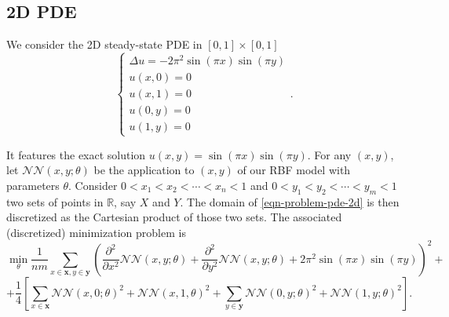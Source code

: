 \documentclass[12pt]{report} %
\newcommand{\tmmathbf}[1]{\ensuremath{\boldsymbol{#1}}}
\newcommand{\mathLaplace}{\Delta}
\begin{document}
\clearpage
\subsection{2D PDE}

We consider the 2D steady-state PDE in $[0, 1] \times [0, 1]$
\begin{equation}
  \left\{\begin{array}{l}
    \mathLaplace u = - 2 \pi^2 \sin (\pi x) \sin (\pi y) \\
    u (x, 0) = 0                                         \\
    u (x, 1) = 0                                         \\
    u (0, y) = 0                                         \\
    u (1, y) = 0
  \end{array}\right. . \label{eqn-problem-pde-2d}
\end{equation}

It features the exact solution $u (x, y) = \sin (\pi x) \sin (\pi y)$. For any
$(x, y)$, let $\mathcal{N}\mathcal{N} (x, y ; \theta)$ be the application to
$(x, y)$ of our RBF model with parameters $\theta$. Consider $0 < x_1 < x_2 <
  \cdots < x_n < 1$ and $0 < y_1 < y_2 < \cdots < y_m < 1$ two sets of points in
$\mathbb{R}$, say $X$ and $Y$. The domain of \eqref{eqn-problem-pde-2d} is
then discretized as the Cartesian product of those two sets. The associated (discretized) minimization problem is
\[ \min_{\theta} \frac{1}{n m} \sum_{x \in \tmmathbf{x}, y \in \tmmathbf{y}}
  \left( \frac{\partial^2}{\partial x^2} \mathcal{N}\mathcal{N} (x, y ;
    \theta) + \frac{\partial^2}{\partial y^2} \mathcal{N}\mathcal{N} (x, y ;
    \theta) + 2 \pi^2 \sin (\pi x) \sin (\pi y) \right)^2 + \]
\[ + \frac{1}{4} \left[ \sum_{x \in \tmmathbf{x}} \mathcal{N}\mathcal{N} (x, 0
    ; \theta)^2 +\mathcal{N}\mathcal{N} (x, 1, \theta)^2 + \sum_{y \in
      \tmmathbf{y}} \mathcal{N}\mathcal{N} (0, y ; \theta)^2
    +\mathcal{N}\mathcal{N} (1, y ; \theta)^2 \right] . \]





\clearpage


\printbibliography



\end{document}
